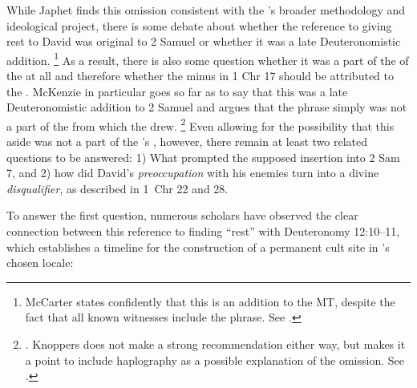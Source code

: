 While Japhet finds this omission consistent with the \chronicler's broader methodology and ideological project,%
    \autocite[328]{japhet1993}
there is some debate about whether the reference to \yahweh giving rest to David was original to 2 Samuel or whether it was a late Deuteronomistic addition.%
    \footnote{McCarter states confidently that this is an addition to the MT, despite the fact that all known witnesses include the phrase. See \cite[191]{mccarter1984}.}
As a result, there is also some question whether it was a part of the \vorlage of the \chronicler at all and therefore whether the minus in 1 Chr 17 should be attributed to the \chronicler. McKenzie in particular goes so far as to say that this was a late Deuteronomistic addition to 2 Samuel and argues that the phrase simply was not a part of the \vorlage from which the \chronicler drew.%
    \footnote{\cite[63]{mckenzie1985}. Knoppers does not make a strong recommendation either way, but makes it a point to include haplography as a possible explanation of the omission. See \cite[666]{knoppers2007}.}
Even allowing for the possibility that this aside was not a part of the \chronicler's \vorlage, however, there remain at least two related questions to be answered: 1) What prompted the supposed insertion into 2 Sam 7, and 2) how did David's \emph{preoccupation} with his enemies turn into a divine \emph{disqualifier}, as described in 1~Chr 22 and 28.

To answer the first question, numerous scholars have observed the clear connection between this reference to finding ``rest'' with Deuteronomy 12:10--11, which establishes a timeline for the construction of a permanent cult site in \yahweh's chosen locale:

